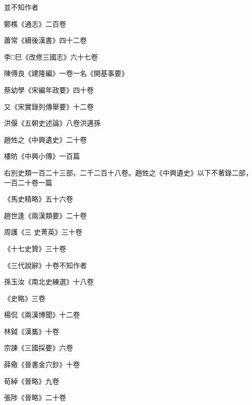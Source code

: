 \begin{pinyinscope}
 並不知作者



 鄭樵《通志》二百卷



 蕭常《續後漢書》四十二卷



 李□巳《改修三國志》六十七卷



 陳傅良《建隆編》一卷一名《開基事要》



 蔡幼學《宋編年政要》四十卷



 又《宋實錄列傳舉要》十二卷



 洪偃《五朝史述論》八卷洪邁孫



 趙甡之《中興遺史》二十卷



 樓昉《中興小傳》一百篇



 右別史類一百二十三部，二千二百十八卷。趙甡之《中興遺史》以下不著錄二部，一百二十卷一篇



 《馬史精略》五十六卷



 趙世逢《兩漢類要》二十卷



 周護《三
 史菁英》三十卷



 《十七史贊》三十卷



 《三代說辭》十卷不知作者



 孫玉汝《南北史練選》十八卷



 《史略》三卷



 楊侃《兩漢博聞》十二卷



 林鉞《漢巂》十卷



 宗諫《三國採要》六卷



 薛儆《晉書金穴鈔》十卷



 荀綽《晉略》九卷



 張陟《晉略》二十卷




\end{pinyinscope}
